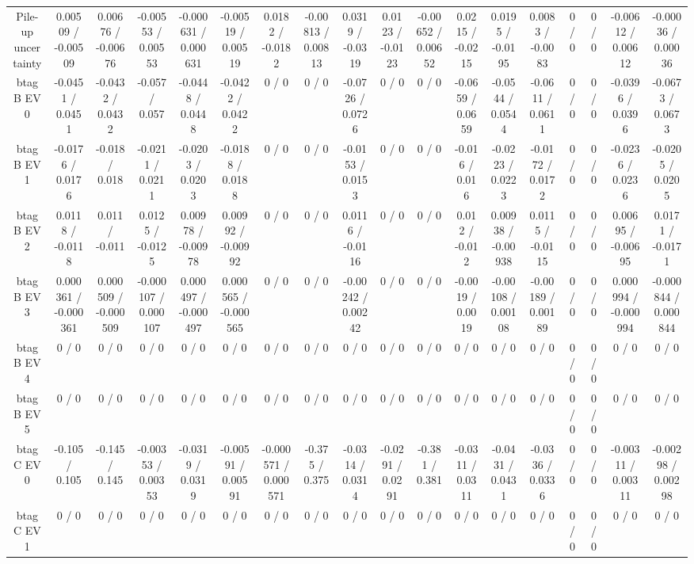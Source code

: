 \documentclass[10pt]{article}
\begin{document}
\begin{table}[htbp]
\begin{center}
\begin{tabular}{|c|c|c|c|c|c|c|c|c|c|c|c|c|c|c|c|c|c|}
  Pile-up uncertainty & 0.00509 / -0.00509 & 0.00676 / -0.00676 & -0.00553 / 0.00553 & -0.000631 / 0.000631 & -0.00519 / 0.00519 & 0.0182 / -0.0182 & -0.00813 / 0.00813 & 0.0319 / -0.0319 & 0.0123 / -0.0123 & -0.00652 / 0.00652 & 0.0215 / -0.0215 & 0.0195 / -0.0195 & 0.0083 / -0.0083 & 0 / 0 & 0 / 0 & -0.00612 / 0.00612 & -0.00036 / 0.00036 \\ 
  btag B EV 0 & -0.0451 / 0.0451 & -0.0432 / 0.0432 & -0.057 / 0.057 & -0.0448 / 0.0448 & -0.0422 / 0.0422 & 0 / 0 & 0 / 0 & -0.0726 / 0.0726 & 0 / 0 & 0 / 0 & -0.0659 / 0.0659 & -0.0544 / 0.0544 & -0.0611 / 0.0611 & 0 / 0 & 0 / 0 & -0.0396 / 0.0396 & -0.0673 / 0.0673 \\ 
  btag B EV 1 & -0.0176 / 0.0176 & -0.018 / 0.018 & -0.0211 / 0.0211 & -0.0203 / 0.0203 & -0.0188 / 0.0188 & 0 / 0 & 0 / 0 & -0.0153 / 0.0153 & 0 / 0 & 0 / 0 & -0.016 / 0.016 & -0.0223 / 0.0223 & -0.0172 / 0.0172 & 0 / 0 & 0 / 0 & -0.0236 / 0.0236 & -0.0205 / 0.0205 \\ 
  btag B EV 2 & 0.0118 / -0.0118 & 0.011 / -0.011 & 0.0125 / -0.0125 & 0.00978 / -0.00978 & 0.00992 / -0.00992 & 0 / 0 & 0 / 0 & 0.0116 / -0.0116 & 0 / 0 & 0 / 0 & 0.012 / -0.012 & 0.00938 / -0.00938 & 0.0115 / -0.0115 & 0 / 0 & 0 / 0 & 0.00695 / -0.00695 & 0.0171 / -0.0171 \\ 
  btag B EV 3 & 0.000361 / -0.000361 & 0.000509 / -0.000509 & -0.000107 / 0.000107 & 0.000497 / -0.000497 & 0.000565 / -0.000565 & 0 / 0 & 0 / 0 & -0.00242 / 0.00242 & 0 / 0 & 0 / 0 & -0.0019 / 0.0019 & -0.00108 / 0.00108 & -0.00189 / 0.00189 & 0 / 0 & 0 / 0 & 0.000994 / -0.000994 & -0.000844 / 0.000844 \\ 
  btag B EV 4 & 0 / 0 & 0 / 0 & 0 / 0 & 0 / 0 & 0 / 0 & 0 / 0 & 0 / 0 & 0 / 0 & 0 / 0 & 0 / 0 & 0 / 0 & 0 / 0 & 0 / 0 & 0 / 0 & 0 / 0 & 0 / 0 & 0 / 0 \\ 
  btag B EV 5 & 0 / 0 & 0 / 0 & 0 / 0 & 0 / 0 & 0 / 0 & 0 / 0 & 0 / 0 & 0 / 0 & 0 / 0 & 0 / 0 & 0 / 0 & 0 / 0 & 0 / 0 & 0 / 0 & 0 / 0 & 0 / 0 & 0 / 0 \\ 
  btag C EV 0 & -0.105 / 0.105 & -0.145 / 0.145 & -0.00353 / 0.00353 & -0.0319 / 0.0319 & -0.00591 / 0.00591 & -0.000571 / 0.000571 & -0.375 / 0.375 & -0.0314 / 0.0314 & -0.0291 / 0.0291 & -0.381 / 0.381 & -0.0311 / 0.0311 & -0.0431 / 0.0431 & -0.0336 / 0.0336 & 0 / 0 & 0 / 0 & -0.00311 / 0.00311 & -0.00298 / 0.00298 \\ 
  btag C EV 1 & 0 / 0 & 0 / 0 & 0 / 0 & 0 / 0 & 0 / 0 & 0 / 0 & 0 / 0 & 0 / 0 & 0 / 0 & 0 / 0 & 0 / 0 & 0 / 0 & 0 / 0 & 0 / 0 & 0 / 0 & 0 / 0 & 0 / 0 \\ 

\end{tabular}
\end{center}
\end{table}
\end{document}

